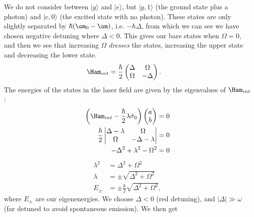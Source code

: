 \documentclass[lasers.tex]{subfiles}
\begin{document}
We do not consider between $|g\rangle$ and $|e\rangle$, but $|g,1\rangle$ (the ground state plus a photon) and $|e,0\rangle$ (the excited state with no photon).
These states are only slightly separated by $\hbar(\om_0-\om)$, i.e. $-\hbar\Delta$, from which we can see we have chosen negative detuning where $\Delta < 0$.
This gives our bare states when $\Omega=0$, and then we see that increasing $\Omega$ \emph{dresses} the states, increasing the upper state and decreasing the lower state.
\begin{align}
    \Ham_{int} &= \frac{\hbar}{2}\begin{pmatrix}\Delta & \Omega \\ \Omega & -\Delta\end{pmatrix}.
\end{align}
The energies of the states in the laser field are given by the eigenvalues of $\Ham_{int}$:
\begin{align}
    \left(\Ham_{int}-\frac{\hbar}{2}\lambda\hat{\sigma}_0\right)\begin{pmatrix}a\\ b\end{pmatrix} &= 0 \\
    \frac{\hbar}{2}\begin{vmatrix} \Delta-\lambda & \Omega \\ \Omega & -\Delta-\lambda \end{vmatrix} &= 0 \\
    -\Delta^2+\lambda^2-\Omega^2 &= 0 
\end{align}
\begin{align}
    \lambda^2 &= \Delta^2+\Omega^2 \\
    \lambda &= \pm\sqrt{\Delta^2+\Omega^2} \\
    E_{\pm} &= \pm\frac{\hbar}{2}\sqrt{\Delta^2+\Omega^2},
\end{align}
where $E_\pm$ are our eigenenergies.
We choose $\Delta<0$ (red detuning), and $|\Delta|\gg\omega$ (far detuned to avoid spontaneous emission).
We then get
\end{document}

